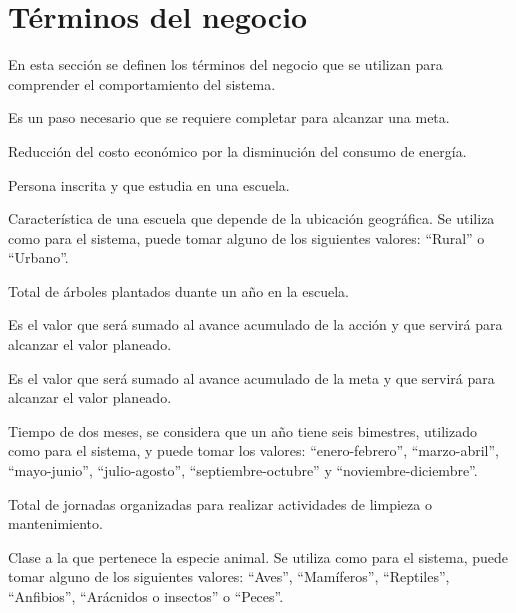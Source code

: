 \section{Términos del negocio}
\label{gls:terminosNegocio}
En esta sección se definen los términos del negocio que se utilizan para comprender el comportamiento del sistema.

\begin{description}
     Es un paso necesario que se requiere completar para alcanzar una meta.
    
     Reducción del costo económico por la disminución del consumo de energía.

     Persona inscrita y que estudia en una escuela.

     Característica de una escuela que depende de la ubicación geográfica. Se utiliza como  para el sistema, puede tomar alguno de los siguientes valores: ``Rural'' o ``Urbano''.
    
     Total de árboles plantados duante un año en la escuela.

     Es el valor que será sumado al avance acumulado de la acción y que servirá para alcanzar el valor planeado.
    
     Es el valor que será sumado al avance acumulado de la meta y que servirá para alcanzar el valor planeado.
    
     Tiempo de dos meses, se considera que un año tiene seis bimestres, utilizado como  para el sistema, y puede tomar los valores: ``enero-febrero'', ``marzo-abril'', ``mayo-junio'', ``julio-agosto'', ``septiembre-octubre'' y ``noviembre-diciembre''.
    
     Total de jornadas organizadas para realizar actividades de limpieza o mantenimiento.

     Clase a la que pertenece la especie animal. Se utiliza como  para el sistema, puede tomar alguno de los siguientes valores: ``Aves'', ``Mamíferos'', ``Reptiles'', ``Anfibios'', ``Arácnidos o insectos'' o ``Peces''.


\end{description}
